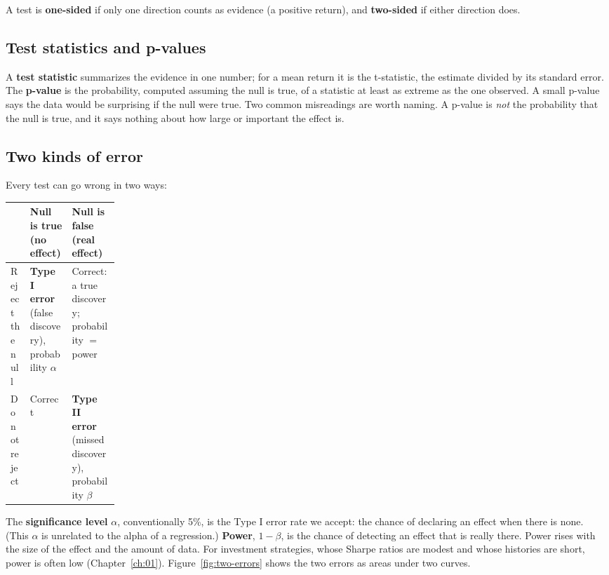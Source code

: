 A test is \textbf{one-sided} if only one direction counts as evidence (a positive return), and \textbf{two-sided} if either direction does.

\subsection{Test statistics and p-values}

A \textbf{test statistic} summarizes the evidence in one number; for a mean return it is the t-statistic, the estimate divided by its standard error. The \textbf{p-value} is the probability, computed assuming the null is true, of a statistic at least as extreme as the one observed. A small p-value says the data would be surprising if the null were true. Two common misreadings are worth naming. A p-value is \emph{not} the probability that the null is true, and it says nothing about how large or important the effect is.

\subsection{Two kinds of error}

Every test can go wrong in two ways:

\begin{center}
\small
\begin{tabularx}{0.9\linewidth}{@{}>{\raggedright\arraybackslash}p{0.18\linewidth}>{\raggedright\arraybackslash}X>{\raggedright\arraybackslash}X@{}}
\toprule
 & Null is true (no effect) & Null is false (real effect) \\
\midrule
Reject the null & \textbf{Type I error} (false discovery), probability $\alpha$ & Correct: a true discovery; probability $=$ power \\
Do not reject & Correct & \textbf{Type II error} (missed discovery), probability $\beta$ \\
\bottomrule
\end{tabularx}
\end{center}

The \textbf{significance level} $\alpha$, conventionally 5\%, is the Type I error rate we accept: the chance of declaring an effect when there is none. (This $\alpha$ is unrelated to the alpha of a regression.) \textbf{Power}, $1 - \beta$, is the chance of detecting an effect that is really there. Power rises with the size of the effect and the amount of data. For investment strategies, whose Sharpe ratios are modest and whose histories are short, power is often low (Chapter~\ref{ch:01}). 
Figure~\ref{fig:two-errors} shows the two errors as areas under two curves.

